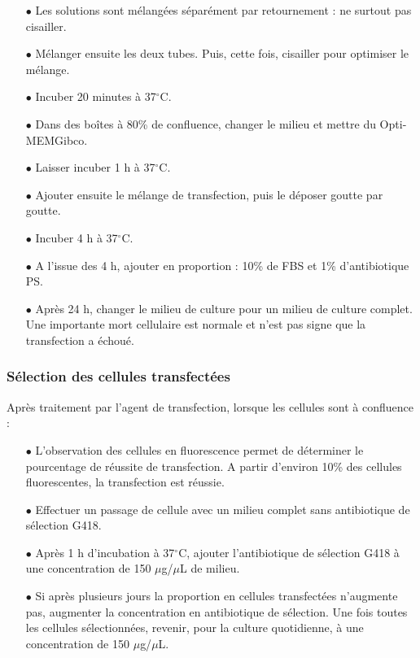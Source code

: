\begin{itemize}
		\item[$\bullet$] Les solutions sont mélangées séparément par retournement : ne surtout pas cisailler. 
		
		\item[$\bullet$] Mélanger ensuite les deux tubes. Puis, cette fois, cisailler pour optimiser le mélange. 
		\item[$\bullet$]  Incuber 20 minutes à 37$^{\circ}$C.
		
		\item[$\bullet$] Dans des boîtes à 80\% de confluence, changer le milieu et mettre du Opti-MEM\texttrademark Gibco\texttrademark. 
		\item[$\bullet$] Laisser incuber 1 h à 37$^{\circ}$C.
		
		\item[$\bullet$] Ajouter ensuite le mélange de transfection, puis le déposer goutte par goutte. 
		
		\item[$\bullet$] Incuber 4 h à 37$^{\circ}$C.
		
		\item[$\bullet$] A l'issue des 4 h, ajouter en proportion : 10\% de FBS et 1\% d'antibiotique PS. 
		
		\item[$\bullet$] Après 24 h, changer le milieu de culture pour un milieu de culture complet. Une importante mort cellulaire est normale et n'est pas signe que la transfection a échoué.
		\end{itemize}
			\subsubsection*{Sélection des cellules transfectées}
			Après traitement par l'agent de transfection, lorsque les cellules sont à confluence : 
			\begin{itemize}
			\item[$\bullet$] L'observation des cellules en fluorescence permet de déterminer le pourcentage de réussite de transfection. A partir d'environ 10\% des cellules fluorescentes, la transfection est réussie. 
			\item[$\bullet$] Effectuer un passage de cellule avec un milieu complet sans antibiotique de sélection G418.
			\item[$\bullet$] Après 1 h d'incubation à 37$^{\circ}$C, ajouter l'antibiotique de sélection G418 à une concentration de 150 $\mu$g/$\mu$L de milieu.
			\item[$\bullet$] Si après plusieurs jours la proportion en cellules transfectées n'augmente pas, augmenter la concentration en antibiotique de sélection. Une fois toutes les cellules sélectionnées, revenir, pour la culture quotidienne, à une concentration de  150 $\mu$g/$\mu$L.
			\end{itemize}
	


